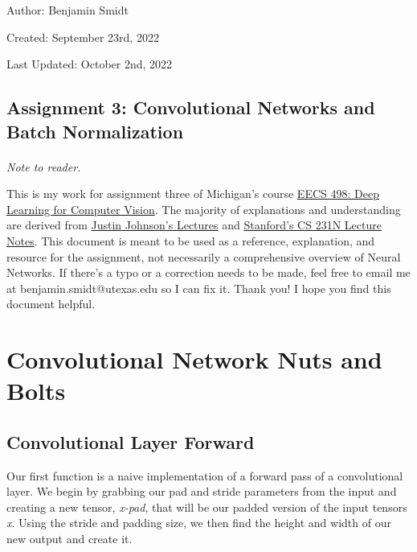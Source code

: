 \documentclass[12pt]{article}
\begin{document}
\noindent Author: Benjamin Smidt

\noindent Created: September 23rd, 2022

\noindent Last Updated: October 2nd, 2022
\begin{center}
\section*{Assignment 3: Convolutional Networks and Batch Normalization}
\end{center}

\paragraph{} \emph{Note to reader.} 

This is my work for assignment three of Michigan's course
\href{https://web.eecs.umich.edu/~justincj/teaching/eecs498/WI2022/}
{EECS 498: Deep Learning for Computer Vision}. The majority of explanations and understanding are 
derived from \href{https://www.youtube.com/watch?v=dJYGatp4SvA&list=PL5-TkQAfAZFbzxjBHtzdVCWE0Zbhomg7r&index=1}
{Justin Johnson's Lectures} and \href{http://cs231n.stanford.edu/schedule.html}{Stanford's CS 231N Lecture Notes}.
This document is meant to be used as a reference, 
explanation, and resource for the assignment, not necessarily a comprehensive overview
of Neural Networks. If there's a typo or a correction needs to be made, feel free to 
email me at benjamin.smidt@utexas.edu so I can fix it. Thank you! I hope you find this 
document helpful.

\newpage
\tableofcontents{}

\newpage

\section{Convolutional Network Nuts and Bolts}

\subsection{Convolutional Layer Forward}
Our first function is a naive implementation of a forward pass of a convolutional 
layer. We begin by grabbing our pad and stride parameters from the input and creating a 
new tensor, \emph{x-pad}, that will be our padded version of the input tensors \emph{x}. 
Using the stride and padding size, we then find the height and width of our new output 
and create it. 
\end{document}
